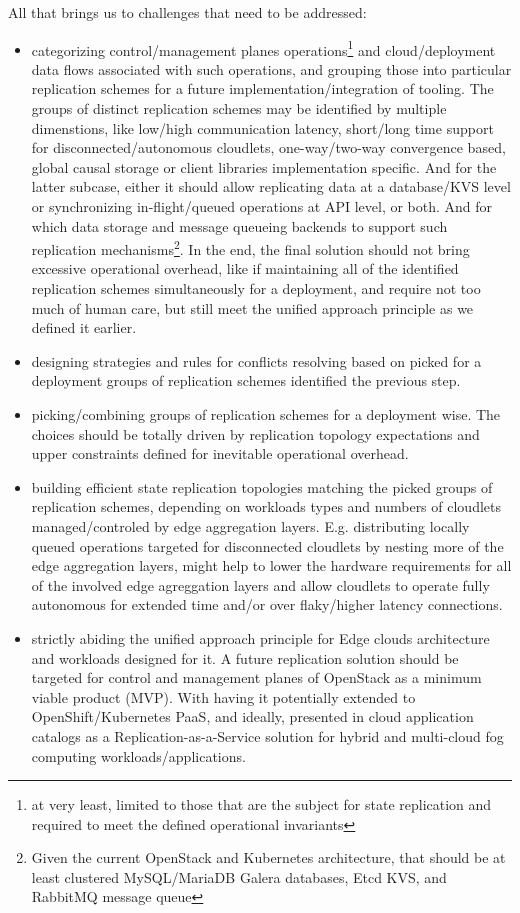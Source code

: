 \documentclass[conference]{IEEEtran}
\begin{document}
All that brings us to challenges that need to be addressed:
\begin{itemize}
  \item categorizing control/management planes operations\footnote{at very
    least, limited to those that are the subject for state replication and
    required to meet the defined operational invariants} and cloud/deployment
    data flows associated with such operations, and grouping those into
    particular replication schemes for a future implementation/integration of
    tooling. The groups of distinct replication schemes may be identified by
    multiple dimenstions, like low/high communication latency, short/long time
    support for disconnected/autonomous cloudlets, one-way/two-way convergence
    based, global causal storage or client libraries implementation specific.
    And for the latter subcase, either it should allow replicating data at a
    database/KVS level or synchronizing in-flight/queued operations at API
    level, or both. And for which data storage and message queueing backends to
    support such replication mechanisms\footnote{Given the current OpenStack
    and Kubernetes architecture, that should be at least clustered
    MySQL/MariaDB Galera databases, Etcd KVS, and RabbitMQ message queue}. In
    the end, the final solution should not bring excessive operational
    overhead, like if maintaining all of the identified replication schemes
    simultaneously for a deployment, and require not too much of human care,
    but still meet the unified approach principle as we defined it earlier.
  \item designing strategies and rules for conflicts resolving based on picked
    for a deployment groups of replication schemes identified the previous step.
  \item picking/combining groups of replication schemes for a deployment wise.
    The choices should be totally driven by replication topology expectations
    and upper constraints defined for inevitable operational overhead.
  \item building efficient state replication topologies matching the picked
    groups of replication schemes, depending on workloads types and numbers of
    cloudlets managed/controled by edge aggregation layers. E.g. distributing
    locally queued operations targeted for disconnected cloudlets by nesting
    more of the edge aggregation layers, might help to lower the hardware
    requirements for all of the involved edge agreggation layers and allow
    cloudlets to operate fully autonomous for extended time and/or over
    flaky/higher latency connections.
  \item strictly abiding the unified approach principle for Edge clouds architecture
    and workloads designed for it. A future replication solution should be
    targeted for control and management planes of OpenStack as a minimum viable
    product (MVP). With having it potentially extended to OpenShift/Kubernetes
    PaaS, and ideally, presented in cloud application catalogs as a
    Replication-as-a-Service solution for hybrid and multi-cloud fog computing
    workloads/applications.
\end{itemize}
\end{document}
